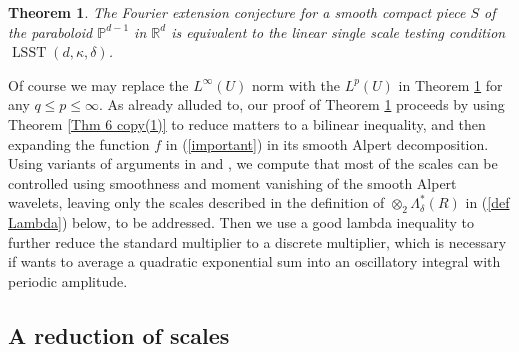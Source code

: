 \documentclass{amsart}%
\newtheorem{theorem}{Theorem}
\theoremstyle{plain}
\numberwithin{equation}{section}
\begin{document}
\begin{theorem}
\label{Thm LSST}The Fourier extension conjecture for a smooth compact piece
$S$ of the paraboloid $\mathbb{P}^{d-1}$ in $\mathbb{R}^{d}$ is equivalent to
the linear single scale testing condition $\operatorname*{LSST}\left(
d,\kappa,\delta\right)  $.
\end{theorem}

Of course we may replace the $L^{\infty}\left(  U\right)  $ norm with the
$L^{p}\left(  U\right)  $ in Theorem \ref{Thm LSST} for any $q\leq p\leq
\infty$. As already alluded to, our proof of Theorem \ref{Thm LSST} proceeds
by using Theorem \ref{Thm 6 copy(1)} to reduce matters to a bilinear
inequality, and then expanding the function $f$ in (\ref{important}) in its
smooth Alpert decomposition. Using variants of arguments in \cite{RiSa} and
\cite{Saw7}, we compute that most of the scales can be controlled using
smoothness and moment vanishing of the smooth Alpert wavelets, leaving only
the scales described in the definition of $\otimes_{2}\Lambda_{\delta}^{\ast
}\left(  R\right)  $ in (\ref{def Lambda}) below, to be addressed. Then we use
a good lambda inequality to further reduce the standard multiplier to a
discrete multiplier, which is necessary if wants to average a quadratic
exponential sum into an oscillatory integral with periodic amplitude.

\subsection{A reduction of scales}
\end{document}
